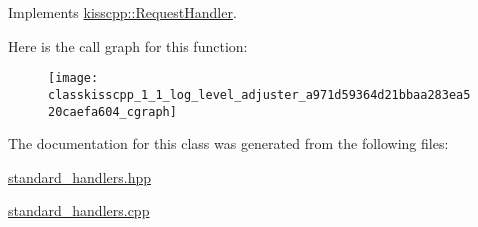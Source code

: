 Implements \hyperlink{classkisscpp_1_1_request_handler_a3606f772c07297826847a8e36226cdaa}{kisscpp\-::\-Request\-Handler}.



Here is the call graph for this function\-:\nopagebreak
\begin{figure}[H]
\begin{center}
\leavevmode
\texttt{[image: classkisscpp\_1\_1\_log\_level\_adjuster\_a971d59364d21bbaa283ea520caefa604\_cgraph]}
\end{center}
\end{figure}




The documentation for this class was generated from the following files\-:\begin{DoxyCompactItemize}
\item 
\hyperlink{standard__handlers_8hpp}{standard\-\_\-handlers.\-hpp}\item 
\hyperlink{standard__handlers_8cpp}{standard\-\_\-handlers.\-cpp}\end{DoxyCompactItemize}
